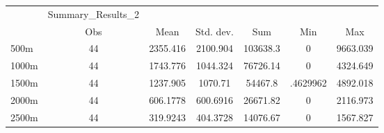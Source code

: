\begin{tabular}{l*{6}{c}}
\hline\hline
            &Summary\_Results\_2&            &            &            &            &            \\
            &         Obs&        Mean&   Std. dev.&         Sum&         Min&         Max\\
\hline
500m        &          44&    2355.416&    2100.904&    103638.3&           0&    9663.039\\
1000m       &          44&    1743.776&    1044.324&    76726.14&           0&    4324.649\\
1500m       &          44&    1237.905&     1070.71&     54467.8&    .4629962&    4892.018\\
2000m       &          44&    606.1778&    600.6916&    26671.82&           0&    2116.973\\
2500m       &          44&    319.9243&    404.3728&    14076.67&           0&    1567.827\\
\hline\hline
\end{tabular}
